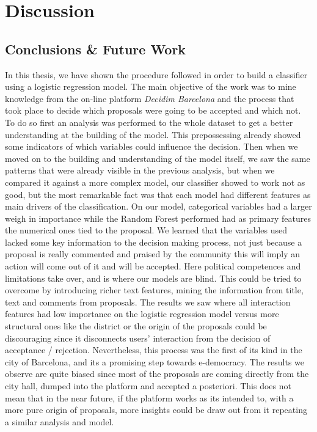 \chapter{Discussion}

\section{Conclusions \& Future Work}

In this thesis, we have shown the procedure followed in order to build a classifier using a logistic regression model. The main objective of the work was to mine knowledge from the on-line platform \emph{Decidim Barcelona} and the process that took place to decide which proposals were going to be accepted and which not. To do so first an analysis was performed to the whole dataset to get a better understanding at the building of the model. This prepossessing already showed some indicators of which variables could influence the decision. Then when we moved on to the building and understanding of the model itself, we saw the same patterns that were already visible in the previous analysis, but when we compared it against a more complex model, our classifier showed to work not as good, but the most remarkable fact was that each model had different features as main drivers of the classification. On our model, categorical variables had a larger weigh in importance while the Random Forest performed had as primary features the numerical ones tied to the proposal. We learned that the variables used lacked some key information to the decision making process, not just because a proposal is really commented and praised by the community this will imply an action will come out of it and will be accepted. Here political competences and limitations take over, and is where our models are blind. This could be tried to overcome by introducing richer text features, mining the information from title, text and comments from proposals. The results we saw where all interaction features had low importance on the logistic regression model versus more structural ones like the district or the origin of the proposals could be discouraging since it disconnects users' interaction from the decision of acceptance / rejection. Nevertheless, this process was the first of its kind in the city of Barcelona, and its a promising step towards e-democracy. The results we observe are quite biased since most of the proposals are coming directly from the city hall, dumped into the platform and accepted a posteriori. This does not mean that in the near future, if the platform works as its intended to, with a more pure origin of proposals, more insights could be draw out from it repeating a similar analysis and model.

\newpage


